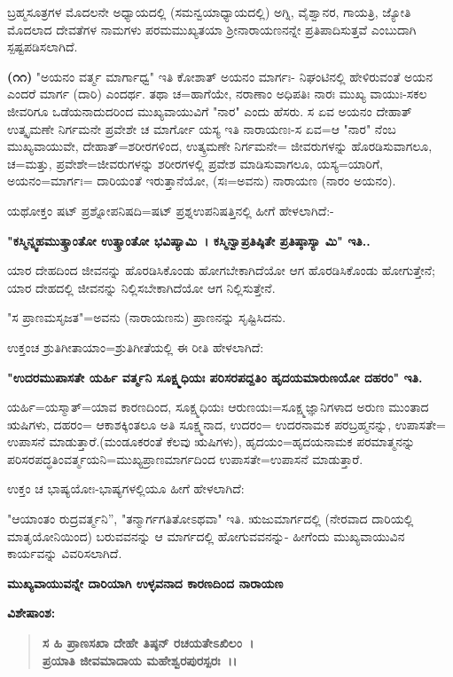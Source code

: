 ಬ್ರಹ್ಮಸೂತ್ರಗಳ ಮೊದಲನೇ ಅಧ್ಯಾಯದಲ್ಲಿ (ಸಮನ್ವಯಾಧ್ಯಾಯದಲ್ಲಿ) ಅಗ್ನಿ, ವೈಶ್ವಾನರ, ಗಾಯತ್ರಿ, ಜ್ಯೋತಿ ಮೊದಲಾದ ದೇವತೆಗಳ ನಾಮಗಳು ಪರಮಮುಖ್ಯತಯಾ ಶ‍್ರೀನಾರಾಯಣನನ್ನೇ ಪ್ರತಿಪಾದಿಸುತ್ತವೆ ಎಂಬುದಾಗಿ ಸ್ಪಷ್ಟಪಡಿಸಲಾಗಿದೆ.

\textbf{(೧೧)} "ಅಯನಂ ವರ್ತ್ಮ ಮಾರ್ಗಾಧ್ವ" ಇತಿ ಕೋಶಾತ್ ಅಯನಂ ಮಾರ್ಗಃ- ನಿಘಂಟಿನಲ್ಲಿ ಹೇಳಿರುವಂತೆ ಅಯನ ಎಂದರೆ ಮಾರ್ಗ (ದಾರಿ) ಎಂದರ್ಥ. ತಥಾ ಚ=ಹಾಗೆಯೇ, ನರಾಣಾಂ ಅಧಿಪತಿಃ ನಾರಃ ಮುಖ್ಯ ವಾಯುಃ-ಸಕಲ ಜೀವರಿಗೂ ಒಡೆಯನಾದುದರಿಂದ ಮುಖ್ಯವಾಯುವಿಗೆ "ನಾರ" ಎಂದು ಹೆಸರು. ಸ ಏವ ಅಯನಂ ದೇಹಾತ್ ಉತ್ಕೃಮಣೇ ನಿರ್ಗಮನೇ ಪ್ರವೇಶೇ ಚ ಮಾರ್ಗೋ ಯಸ್ಯ ಇತಿ ನಾರಾಯಣಃ-ಸ ಏವ=ಆ "ನಾರ" ನೆಂಬ ಮುಖ್ಯವಾಯುವೇ, ದೇಹಾತ್=ಶರೀರಗಳಿಂದ, ಉತ್ಕ್ರಮಣೇ ನಿರ್ಗಮನೇ= ಜೀವರುಗಳನ್ನು ಹೊರಡಿಸುವಾಗಲೂ, ಚ=ಮತ್ತು, ಪ್ರವೇಶೇ=ಜೀವರುಗಳನ್ನು ಶರೀರಗಳಲ್ಲಿ ಪ್ರವೇಶ ಮಾಡಿಸುವಾಗಲೂ, ಯಸ್ಯ=ಯಾರಿಗೆ, ಅಯನಂ=ಮಾರ್ಗಃ= ದಾರಿಯಂತೆ ಇರುತ್ತಾನೆಯೋ, (ಸಃ=ಅವನು) ನಾರಾಯಣ (ನಾರಂ ಅಯನಂ).

ಯಥೋಕ್ತಂ ಷಟ್ ಪ್ರಶ್ನೋಪನಿಷದಿ=ಷಟ್ ಪ್ರಶ್ನಉಪನಿಷತ್ತಿನಲ್ಲಿ ಹೀಗೆ ಹೇಳಲಾಗಿದೆ:-

\textbf{"ಕಸ್ಮಿನ್ನ್ವಹಮುತ್ಕ್ರಾಂತೋ ಉತ್ಕ್ರಾಂತೋ ಭವಿಷ್ಯಾಮಿ~। ಕಸ್ಮಿನ್ವಾಪ್ರತಿಷ್ಠಿತೇ ಪ್ರತಿಷ್ಠಾಸ್ಯಾ ಮಿ" ಇತಿ..}

ಯಾರ ದೇಹದಿಂದ ಜೀವನನ್ನು ಹೊರಡಿಸಿಕೊಂಡು ಹೋಗಬೇಕಾಗಿದೆಯೋ ಆಗ ಹೊರಡಿಸಿಕೊಂಡು ಹೋಗುತ್ತೇನೆ; ಯಾರ ದೇಹದಲ್ಲಿ ಜೀವನನ್ನು ನಿಲ್ಲಿಸಬೇಕಾಗಿದೆಯೋ ಆಗ ನಿಲ್ಲಿಸುತ್ತೇನೆ.

"ಸ ಪ್ರಾಣಮಸೃಜತ"=ಅವನು (ನಾರಾಯಣನು) ಪ್ರಾಣನನ್ನು ಸೃಷ್ಟಿಸಿದನು.

ಉಕ್ತಂಚ ಶ್ರುತಿಗೀತಾಯಾಂ=ಶ್ರುತಿಗೀತೆಯಲ್ಲಿ ಈ ರೀತಿ ಹೇಳಲಾಗಿದೆ:

\textbf{"ಉದರಮುಪಾಸತೇ ಯರ್ಹಿ ವರ್ತ್ಮನಿ ಸೂಕ್ಷ್ಮಧಿಯಃ ಪರಿಸರಪದ್ದತಿಂ ಹೃದಯಮಾ\-ರುಣಯೋ ದಹರಂ" ಇತಿ.}

ಯರ್ಹಿ=ಯಸ್ಮಾತ್=ಯಾವ ಕಾರಣದಿಂದ, ಸೂಕ್ಷ್ಮಧಿಯಃ ಆರುಣಯಃ=ಸೂಕ್ಷ್ಮಜ್ಞಾನಿ\-ಗಳಾದ ಅರುಣ ಮುಂತಾದ ಋಷಿಗಳು, ದಹರಂ= ಆಕಾಶಕ್ಕಿಂತಲೂ ಅತಿ ಸೂಕ್ಷ್ಮನಾದ, ಉದರಂ= ಉದರನಾಮಕ ಪರಬ್ರಹ್ಮನನ್ನು, ಉಪಾಸತೇ= ಉಪಾಸನೆ ಮಾಡುತ್ತಾರೆ.\break (ಮಂಡೂಕ\-ರಂತೆ ಕೆಲವು ಋಷಿಗಳು), ಹೃದಯಂ=ಹೃದಯನಾಮಕ ಪರಮಾತ್ಮನನ್ನು ಪರಿ\-ಸರಪದ್ಧತಿಂವರ್ತ್ಮಯನಿ=ಮುಖ್ಯಪ್ರಾಣಮಾರ್ಗದಿಂದ ಉಪಾಸತೇ=ಉಪಾಸನೆ ಮಾಡುತ್ತಾರೆ.

ಉಕ್ತಂ ಚ ಭಾಷ್ಯಯೋಃ-ಭಾಷ್ಯಗಳಲ್ಲಿಯೂ ಹೀಗೆ ಹೇಳಲಾಗಿದೆ:

"ಆಯಾಂತಂ ರುದ್ರವರ್ತ್ಮನಿ'', "ತನ್ಮಾರ್ಗಗತಿತೋಽಥವಾ" ಇತಿ. ಋಜುಮಾರ್ಗದಲ್ಲಿ (ನೇರವಾದ ದಾರಿಯಲ್ಲಿ ಮಾತೃಯೋನಿಯಿಂದ) ಬರುವವನನ್ನು ಆ ಮಾರ್ಗದಲ್ಲಿ ಹೋಗುವವನನ್ನು- ಹೀಗೆಂದು ಮುಖ್ಯವಾಯುವಿನ ಕಾರ್ಯವನ್ನು ವಿವರಿಸಲಾಗಿದೆ.

\eject

\begin{center}
\textbf{ಮುಖ್ಯವಾಯುವನ್ನೇ ದಾರಿಯಾಗಿ ಉಳ್ಳವನಾದ ಕಾರಣದಿಂದ ನಾರಾಯಣ}
\end{center}

\noindent
\textbf{ವಿಶೇಷಾಂಶ:\enginline{-}}

\begin{verse}
\textbf{ಸ ಹಿ ಪ್ರಾಣಸಖಾ ದೇಹೇ ತಿಷ್ಠನ್ ರಚಯತೇಽಖಿಲಂ~।}\\\textbf{ಪ್ರಯಾತಿ ಜೀವಮಾದಾಯ ಮಹೇಶ್ವರಪುರಸ್ಪರಃ~।।}
\end{verse}

